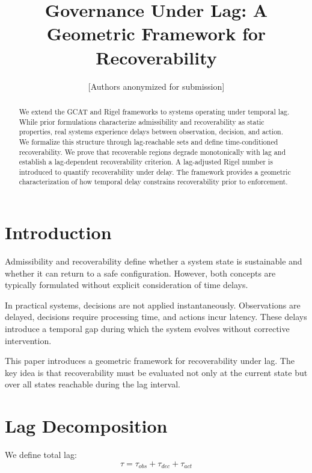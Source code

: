 \documentclass[letterpaper, 10 pt, conference]{ieeeconf}
\title{\bf Governance Under Lag: A Geometric Framework for Recoverability}
\author{[Authors anonymized for submission]}
\begin{document}
\maketitle
\thispagestyle{empty}
\pagestyle{empty}

\begin{abstract}
We extend the GCAT and Rigel frameworks to systems operating under temporal lag. While prior formulations characterize admissibility and recoverability as static properties, real systems experience delays between observation, decision, and action. We formalize this structure through lag-reachable sets and define time-conditioned recoverability. We prove that recoverable regions degrade monotonically with lag and establish a lag-dependent recoverability criterion. A lag-adjusted Rigel number is introduced to quantify recoverability under delay. The framework provides a geometric characterization of how temporal delay constrains recoverability prior to enforcement.
\end{abstract}

\section{Introduction}

Admissibility and recoverability define whether a system state is sustainable and whether it can return to a safe configuration. However, both concepts are typically formulated without explicit consideration of time delays.

In practical systems, decisions are not applied instantaneously. Observations are delayed, decisions require processing time, and actions incur latency. These delays introduce a temporal gap during which the system evolves without corrective intervention.

This paper introduces a geometric framework for recoverability under lag. The key idea is that recoverability must be evaluated not only at the current state but over all states reachable during the lag interval.

\section{Lag Decomposition}

We define total lag:
\begin{equation}
\tau = \tau_{obs} + \tau_{dec} + \tau_{act}
\end{equation}
\end{document}
